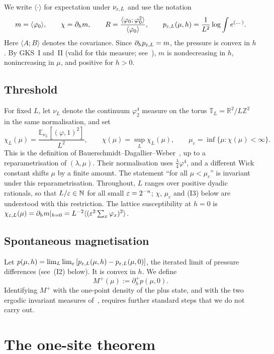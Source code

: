 We write $\langle\cdot\rangle$ for expectation under $\nu_{\varepsilon,L}$ and use the notation
\[
m=\langle\varphi_0\rangle,\qquad \chi=\partial_hm,\qquad R=\frac{\langle\varphi_0;\varphi_0^2\rangle}{\langle\varphi_0\rangle},\qquad
p_{\varepsilon,L}(\mu,h)=\frac1{L^2}\log\int e^{(\dots)} .
\]
Here $\langle A;B\rangle$ denotes the covariance. Since $\partial_hp_{\varepsilon,L}=m$, the pressure is convex in $h$. By GKS~I and~II (valid for this measure; see~\cite{EMN76,Gin70}), $m$ is nondecreasing in $h$, nonincreasing in $\mu$, and positive for $h>0$.

\subsection{Threshold}
For fixed $L$, let $\nu_L$ denote the continuum $\varphi^4_2$ measure on the torus $\mathbb T_L=\mathbb R^2/L\mathbb Z^2$ in the same normalisation, and set
\[
\chi_L(\mu)=\frac{\mathbb E_{\nu_L}[(\varphi,1)^2]}{L^2},\qquad \chi(\mu)=\sup_L\chi_L(\mu),\qquad \mu_c=\inf\{\mu:\chi(\mu)<\infty\}.
\]
This is the definition of Bauerschmidt--Dagallier--Weber~\cite[(1.2)--(1.3)]{BDW25}, up to a reparametrisation of $(\lambda,\mu)$. Their normalisation uses $\tfrac\lambda4\varphi^4$, and a different Wick constant shifts $\mu$ by a finite amount. The statement ``for all $\mu<\mu_c$'' is invariant under this reparametrisation. Throughout, $L$ ranges over positive dyadic rationals, so that $L/\varepsilon\in\mathbb N$ for all small $\varepsilon=2^{-n}$; $\chi$, $\mu_c$ and (I3) below are understood with this restriction. The lattice susceptibility at $h=0$ is $\chi_{\varepsilon,L}(\mu)=\partial_hm|_{h=0}=L^{-2}\langle(\varepsilon^2\sum_x\varphi_x)^2\rangle$.

\subsection{Spontaneous magnetisation}
Let $p(\mu,h)=\lim_L\lim_\varepsilon\,[p_{\varepsilon,L}(\mu,h)-p_{\varepsilon,L}(\mu,0)]$, the iterated limit of pressure differences (see~(I2) below). It is convex in $h$. We define
\[
M^+(\mu):=\partial_h^+p(\mu,0).
\]
Identifying $M^+$ with the one-point density of the plus state, and with the two ergodic invariant measures of~\cite{BDW25}, requires further standard steps that we do not carry out.

\section{The one-site theorem}\label{sec:onesite}


